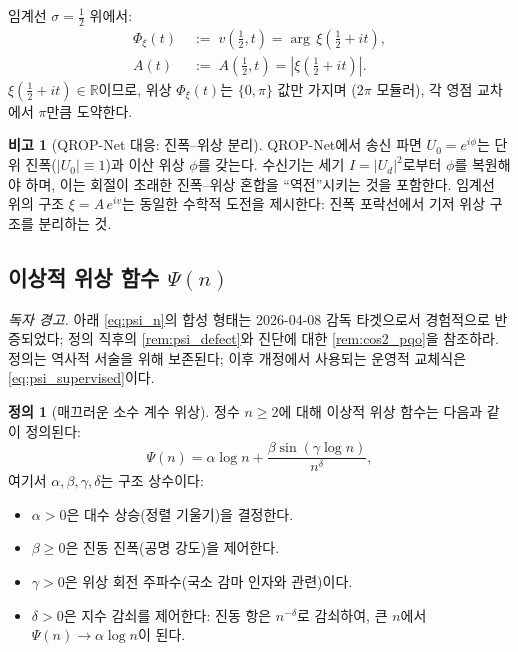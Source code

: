 \documentclass[11pt, a4paper]{article}
\theoremstyle{definition}
\newtheorem{definition}{정의}[section]
\newtheorem{remark}{비고}[section]
\theoremstyle{plain}
\newcommand{\xif}{\xi}
\newcommand{\Phiz}{\Phi_\xi}
\newcommand{\Ampl}{A}
\newcommand{\Psip}{\Psi}
\begin{document}
임계선 $\sigma = \tfrac{1}{2}$ 위에서:
\begin{align}
  \Phiz(t) &\;:=\; v(\tfrac{1}{2}, t) = \arg\,\xif(\tfrac{1}{2}+it),
  \label{eq:phase_crit}\\
  \Ampl(t) &\;:=\; \Ampl(\tfrac{1}{2}, t) = |\xif(\tfrac{1}{2}+it)|.
  \label{eq:amp_crit}
\end{align}
$\xif(\tfrac{1}{2}+it) \in \mathbb{R}$이므로, 위상 $\Phiz(t)$는 $\{0, \pi\}$ 값만 가지며 ($2\pi$ 모듈러), 각 영점 교차에서 $\pi$만큼 도약한다.

\begin{remark}[QROP-Net 대응: 진폭--위상 분리]
\label{rem:amp_phase}
QROP-Net에서 송신 파면 $U_0 = e^{i\phi}$는 단위 진폭($|U_0| \equiv 1$)과 이산 위상 $\phi$를 갖는다. 수신기는 세기 $I = |U_d|^2$로부터 $\phi$를 복원해야 하며, 이는 회절이 초래한 진폭--위상 혼합을 ``역전''시키는 것을 포함한다. 임계선 위의 구조 $\xif = \Ampl\,e^{iv}$는 동일한 수학적 도전을 제시한다: 진폭 포락선에서 기저 위상 구조를 분리하는 것.
\end{remark}


\subsection{이상적 위상 함수 $\Psip(n)$}

\noindent\textit{독자 경고.} 아래 \cref{eq:psi_n}의 합성 형태는 2026-04-08 감독 타겟으로서 경험적으로 반증되었다; 정의 직후의 \cref{rem:psi_defect}와 진단에 대한 \cref{rem:cos2_pqo}을 참조하라. 정의는 역사적 서술을 위해 보존된다; 이후 개정에서 사용되는 운영적 교체식은 \cref{eq:psi_supervised}이다.

\begin{definition}[매끄러운 소수 계수 위상]
\label{def:psi}
정수 $n \geq 2$에 대해 이상적 위상 함수는 다음과 같이 정의된다:
\begin{equation}
  \Psip(n) = \alpha\log n +
  \frac{\beta\sin(\gamma\log n)}{n^\delta},
  \label{eq:psi_n}
\end{equation}
여기서 $\alpha, \beta, \gamma, \delta$는 구조 상수이다:
\begin{itemize}
  \item $\alpha > 0$은 대수 상승(정렬 기울기)을 결정한다.
  \item $\beta \geq 0$은 진동 진폭(공명 강도)을 제어한다.
  \item $\gamma > 0$은 위상 회전 주파수(국소 감마 인자와 관련)이다.
  \item $\delta > 0$은 지수 감쇠를 제어한다: 진동 항은 $n^{-\delta}$로 감쇠하여, 큰 $n$에서 $\Psip(n) \to \alpha\log n$이 된다.
\end{itemize}
\end{definition}
\end{document}
